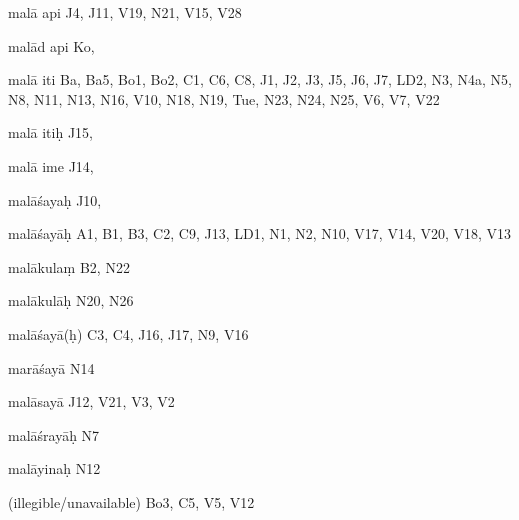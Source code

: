 \begin{ekdosis}
\begin{marma}[hp01_055]
\begin{marma}[hp02_009]
\begin{marma}[hp02_011]
\begin{marma}[hp02_38a]
\begin{description}
        \end{description}
\end{marma}

\begin{marma}[hp02_38b]
\item[malā api] J4, J11, V19, N21, V15, V28
\item[malād api] Ko,
\item[malā iti] Ba, Ba5, Bo1, Bo2, C1, C6, C8, J1, J2, J3, J5, J6, J7, LD2, N3, N4a, N5, N8, N11, N13, N16, V10, N18, N19, Tue, N23, N24, N25, V6, V7, V22
\item[malā itiḥ] J15,
\item[malā ime] J14, 
\item[malāśayaḥ] J10,
\item[malāśayāḥ] A1, B1, B3, C2, C9, J13, LD1, N1, N2, N10, V17, V14, V20, V18, V13
\item[malākulaṃ] B2, N22
\item[malākulāḥ] N20, N26
\item[malāśayā(ḥ)] C3, C4, J16, J17, N9, V16
\item[marāśayā] N14
\item[malāsayā] J12, V21, V3, V2
\item[malāśrayāḥ] N7
\item[malāyinaḥ] N12
\item[(illegible/unavailable)] Bo3, C5, V5, V12
 \begin{description}

        \end{description}
\end{marma}

\begin{marma}[hp02_39]
\item[]
 \begin{description}

        \end{description}
\end{marma}


\end{marma}
\end{marma}
\end{marma}
\end{ekdosis}
